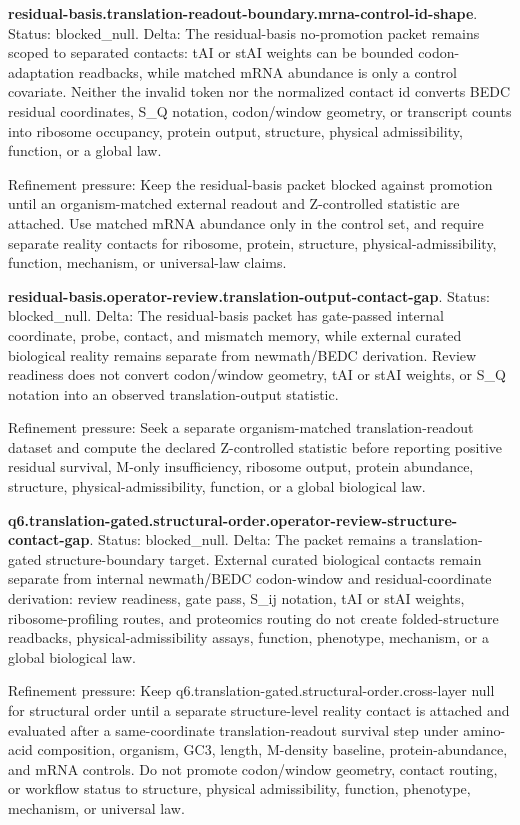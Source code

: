 \textbf{residual-basis.translation-readout-boundary.mrna-control-id-shape}. Status: blocked\_null. Delta: The residual-basis no-promotion packet remains scoped to separated contacts: tAI or stAI weights can be bounded codon-adaptation readbacks, while matched mRNA abundance is only a control covariate. Neither the invalid token nor the normalized contact id converts BEDC residual coordinates, S\_Q notation, codon/window geometry, or transcript counts into ribosome occupancy, protein output, structure, physical admissibility, function, or a global law.

Refinement pressure: Keep the residual-basis packet blocked against promotion until an organism-matched external readout and Z-controlled statistic are attached. Use matched mRNA abundance only in the control set, and require separate reality contacts for ribosome, protein, structure, physical-admissibility, function, mechanism, or universal-law claims.

\textbf{residual-basis.operator-review.translation-output-contact-gap}. Status: blocked\_null. Delta: The residual-basis packet has gate-passed internal coordinate, probe, contact, and mismatch memory, while external curated biological reality remains separate from newmath/BEDC derivation. Review readiness does not convert codon/window geometry, tAI or stAI weights, or S\_Q notation into an observed translation-output statistic.

Refinement pressure: Seek a separate organism-matched translation-readout dataset and compute the declared Z-controlled statistic before reporting positive residual survival, M-only insufficiency, ribosome output, protein abundance, structure, physical-admissibility, function, or a global biological law.

\textbf{q6.translation-gated.structural-order.operator-review-structure-contact-gap}. Status: blocked\_null. Delta: The packet remains a translation-gated structure-boundary target. External curated biological contacts remain separate from internal newmath/BEDC codon-window and residual-coordinate derivation: review readiness, gate pass, S\_ij notation, tAI or stAI weights, ribosome-profiling routes, and proteomics routing do not create folded-structure readbacks, physical-admissibility assays, function, phenotype, mechanism, or a global biological law.

Refinement pressure: Keep q6.translation-gated.structural-order.cross-layer null for structural order until a separate structure-level reality contact is attached and evaluated after a same-coordinate translation-readout survival step under amino-acid composition, organism, GC3, length, M-density baseline, protein-abundance, and mRNA controls. Do not promote codon/window geometry, contact routing, or workflow status to structure, physical admissibility, function, phenotype, mechanism, or universal law.

